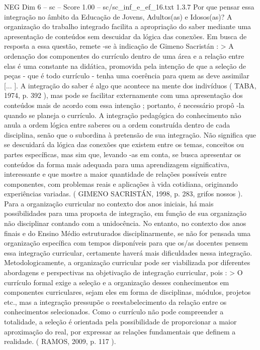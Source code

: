 \begin{textsample}{NEG Dim 6 – sc – Score 1.00 – sc/sc\_inf\_e\_ef\_16.txt}  \label{ex:f6_neg_272}
1.3.7 Por que pensar essa integração no âmbito da Educação de Jovens, Adultos(as) e Idosos(as)?
A organização do trabalho integrado facilita a apropriação do saber mediante uma apresentação de conteúdos sem descuidar da lógica das conexões.
Em busca de resposta a essa questão, remete -se à indicação de Gimeno Sacristán : > A ordenação dos componentes do currículo dentro de uma área e a relação entre elas é uma constante na didática, promovida pela intenção de que a seleção de peças - que é todo currículo - tenha uma coerência para quem as deve assimilar [... ].
A integração do saber é algo que acontece na mente dos indivíduos ( TABA, 1974, p. 392 ), mas pode se facilitar externamente com uma apresentação dos conteúdos mais de acordo com essa intenção ; portanto, é necessário propô -la quando se planeja o currículo.
A integração pedagógica do conhecimento não anula a ordem lógica entre saberes ou a ordem construída dentro de cada disciplina, senão que o subordina à pretensão de sua integração.
Não significa que se descuidará da lógica das conexões que existem entre os temas, conceitos ou partes específicas, mas sim que, levando -as em conta, se busca apresentar os conteúdos da forma mais adequada para uma aprendizagem significativa, interessante e que mostre a maior quantidade de relações possíveis entre componentes, com problemas reais e aplicações à vida cotidiana, originando experiências variadas. ( GIMENO SACRISTÁN, 1998, p. 283, grifos nossos ).
Para a organização curricular no contexto dos anos iniciais, há mais possibilidades para uma proposta de integração, em função de sua organização não disciplinar contando com a unidocência.
No entanto, no contexto dos anos finais e do Ensino Médio estruturados disciplinarmente, se não for pensada uma organização específica com tempos disponíveis para que os/as docentes pensem essa integração curricular, certamente haverá mais dificuldades nessa integração.
Metodologicamente, a organização curricular pode ser viabilizada por diferentes abordagens e perspectivas na objetivação de integração curricular, pois : > O currículo formal exige a seleção e a organização desses conhecimentos em componentes curriculares, sejam eles em forma de disciplinas, módulos, projetos etc., mas a integração pressupõe o reestabelecimento da relação entre os conhecimentos selecionados.
Como o currículo não pode compreender a totalidade, a seleção é orientada pela possibilidade de proporcionar a maior aproximação do real, por expressar as relações fundamentais que definem a realidade. ( RAMOS, 2009, p. 117 ).

\end{textsample}
